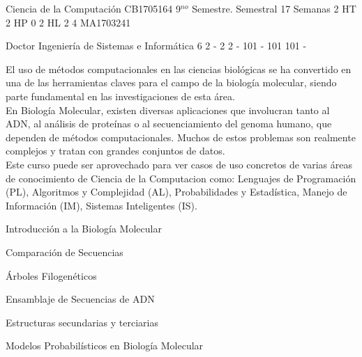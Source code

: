 \documentclass[a4paper,8pt]{article}
\begin{document}
\setNombreProfesor{}
\setGradoProfesorAbreviado{}
\sylabusHeader

\academicaTable
{Ciencia de la Computación} %
{CB1705164} %
{9$^{no}$ Semestre.} %
{Semestral} %
{17 Semanas} %
{2 HT} %
{2 HP} %
{0} %
{2 HL}  %
{2} %
{4} %
{MA1703241} %

\administrativaTable
{Doctor} %
{Ingeniería de Sistemas e Informática} %
{6} %
{2} %
{-} %
{2} %
{2} %
{-} %
{101} %
{-} %
{101} %
{101} %
{-} %


\begin{fundamentacion}
El uso de métodos computacionales en las ciencias biológicas se ha convertido en una de las herramientas claves para el campo de la biología molecular, siendo parte fundamental en las investigaciones de esta área. 
\\
En Biología Molecular, existen diversas aplicaciones que involucran tanto al ADN, al análisis de proteínas o al secuenciamiento del genoma humano, que dependen de métodos computacionales. Muchos de estos problemas son realmente complejos y tratan con grandes conjuntos de datos. 
\\
Este curso puede ser aprovechado para ver casos de uso concretos de varias áreas de conocimiento de Ciencia de la Computacion como: Lenguajes de Programación (PL), Algoritmos y Complejidad (AL), Probabilidades y Estadística, Manejo de Información (IM), Sistemas Inteligentes (IS).

\end{fundamentacion}

\begin{sumilla}
\item Introducción a la Biología Molecular
\item Comparación de Secuencias
\item Árboles Filogenéticos
\item Ensamblaje de Secuencias de ADN
\item Estructuras secundarias y terciarias
\item Modelos Probabilísticos en Biología Molecular

\end{sumilla}
\end{document}
